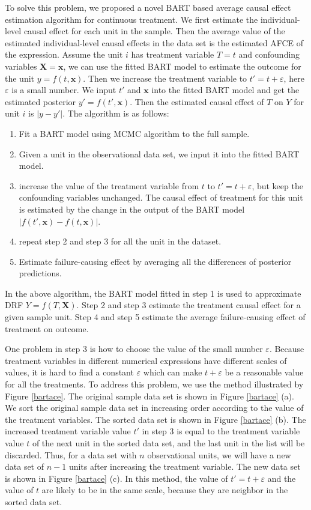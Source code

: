 To solve this problem, we proposed a novel BART based average causal effect estimation algorithm for continuous treatment. We first estimate the individual-level causal effect for  each unit in the sample. Then the average value of the estimated individual-level causal effects in the data set is the estimated AFCE of the expression.  Assume the unit $i$ has treatment variable $T=t$ and confounding variables $\pmb {X}=\pmb {x}$, we can use the fitted BART model to estimate the outcome for the unit $y=f(t,\pmb{x})$. Then we increase the treatment variable to $t'=t+\varepsilon$, here $\varepsilon $ is a small number. We input $t'$ and $\pmb{x}$ into the fitted BART model and get the estimated posterior $y'=f(t',\pmb{x})$. Then the estimated causal effect of $T$ on $Y$ for unit $i$ is $\left| {y - y'} \right|$. The algorithm is as follows:
\begin{enumerate}
\item Fit a BART model using MCMC algorithm to the full sample.
\item Given a unit in the observational data set, we input it into the fitted BART model. 
\item increase the value of the treatment variable from $t$ to $t'=t+\varepsilon$, but keep the confounding variables unchanged. The causal effect of treatment for this unit is estimated by the change in the output of the BART model $|f(t',\pmb{x})-f(t,\pmb{x})|$.
\item repeat step 2 and step 3 for all the unit in the dataset.
\item Estimate failure-causing effect by averaging all the differences of posterior predictions.
\end{enumerate}

In the above algorithm, the BART model fitted in step 1 is used to approximate DRF $Y=f(T,\pmb{X})$. Step 2 and step 3 estimate the treatment causal effect for a given sample unit. Step 4 and step 5 estimate the average failure-causing effect of treatment on outcome.

One problem in step 3 is how to choose the value of the small number $\varepsilon $. Because treatment variables in different numerical expressions have different scales of values, it is hard to find a constant $\varepsilon$ which can make $t+\varepsilon$ be a reasonable value for all the treatments. To address this problem, we use the method illustrated by Figure \ref{bartace}.  The original sample data set is shown in Figure \ref{bartace} (a).  We sort the original sample data set in increasing order according to the value of the treatment variables. The sorted data set is shown in Figure \ref{bartace} (b). The increased treatment variable value $t'$ in step 3 is equal to the treatment variable value $t$ of the next unit in the sorted data set, and the last unit in the list will be discarded. Thus,  for a data set with $n$ observational units, we will have a new data set of $n-1$ units after increasing the treatment variable. The new data set is shown in Figure \ref{bartace} (c). In this method, the value of $t'=t+\varepsilon$ and the value of $t$ are likely to be in the same scale, because they are neighbor in the sorted data set. 

